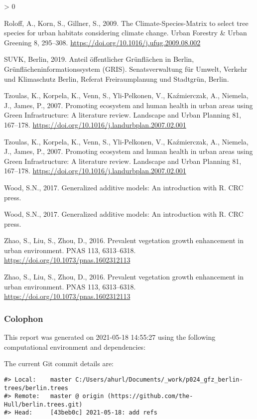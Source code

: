 \documentclass[
]{article}
\newlength{\cslhangindent}
\newenvironment{CSLReferences}[2] %
 {%
  \setlength{\parindent}{0pt}
  \ifodd #1 \everypar{\setlength{\hangindent}{\cslhangindent}}\ignorespaces\fi
  \ifnum #2 > 0
  \setlength{\parskip}{#2\baselineskip}
  \fi
 }%
 {}
\begin{document}
\begin{CSLReferences}{1}{0}
\leavevmode\hypertarget{ref-roloff2009}{}%
Roloff, A., Korn, S., Gillner, S., 2009. The {Climate}-{Species}-{Matrix} to select tree species for urban habitats considering climate change. Urban Forestry \& Urban Greening 8, 295--308. \url{https://doi.org/10.1016/j.ufug.2009.08.002}

\leavevmode\hypertarget{ref-suvkberlin2019}{}%
SUVK, Berlin, 2019. Anteil öffentlicher {Grünflächen} in {Berlin}, Grünflächeninformationssystem ({GRIS}). {Senatsverwaltung für Umwelt, Verkehr und Klimaschutz Berlin, Referat Freiraumplanung und Stadtgrün}, {Berlin}.

\leavevmode\hypertarget{ref-tzoulas2007}{}%
Tzoulas, K., Korpela, K., Venn, S., Yli-Pelkonen, V., Kaźmierczak, A., Niemela, J., James, P., 2007. Promoting ecosystem and human health in urban areas using {Green Infrastructure}: {A} literature review. Landscape and Urban Planning 81, 167--178. \url{https://doi.org/10.1016/j.landurbplan.2007.02.001}

\leavevmode\hypertarget{ref-tzoulas2007}{}%
Tzoulas, K., Korpela, K., Venn, S., Yli-Pelkonen, V., Kaźmierczak, A., Niemela, J., James, P., 2007. Promoting ecosystem and human health in urban areas using {Green Infrastructure}: {A} literature review. Landscape and Urban Planning 81, 167--178. \url{https://doi.org/10.1016/j.landurbplan.2007.02.001}

\leavevmode\hypertarget{ref-wood2017}{}%
Wood, S.N., 2017. Generalized additive models: An introduction with {R}. {CRC press}.

\leavevmode\hypertarget{ref-wood2017}{}%
Wood, S.N., 2017. Generalized additive models: An introduction with {R}. {CRC press}.

\leavevmode\hypertarget{ref-zhao2016}{}%
Zhao, S., Liu, S., Zhou, D., 2016. Prevalent vegetation growth enhancement in urban environment. PNAS 113, 6313--6318. \url{https://doi.org/10.1073/pnas.1602312113}

\leavevmode\hypertarget{ref-zhao2016}{}%
Zhao, S., Liu, S., Zhou, D., 2016. Prevalent vegetation growth enhancement in urban environment. PNAS 113, 6313--6318. \url{https://doi.org/10.1073/pnas.1602312113}

\end{CSLReferences}

\newpage

\hypertarget{colophon}{%
\subsubsection{Colophon}\label{colophon}}

This report was generated on 2021-05-18 14:55:27 using the following computational environment and dependencies:

The current Git commit details are:

\begin{verbatim}
#> Local:    master C:/Users/ahurl/Documents/_work/p024_gfz_berlin-trees/berlin.trees
#> Remote:   master @ origin (https://github.com/the-Hull/berlin.trees.git)
#> Head:     [43beb0c] 2021-05-18: add refs
\end{verbatim}
\end{document}
